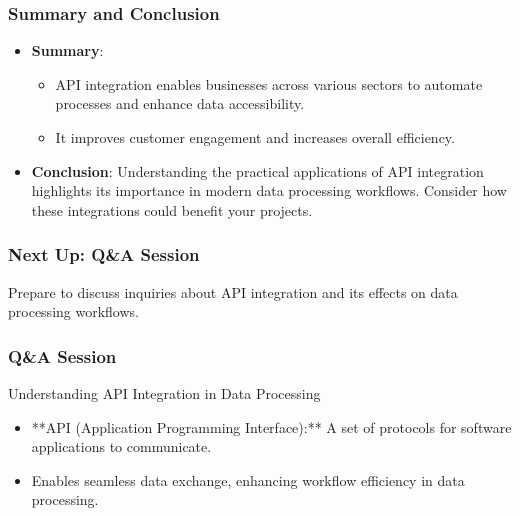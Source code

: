 \documentclass[aspectratio=169]{beamer}
\begin{document}
\begin{frame}[fragile]
    \frametitle{Summary and Conclusion}
    \begin{itemize}
        \item \textbf{Summary}:
        \begin{itemize}
            \item API integration enables businesses across various sectors to automate processes and enhance data accessibility.
            \item It improves customer engagement and increases overall efficiency.
        \end{itemize}
        \item \textbf{Conclusion}:
        Understanding the practical applications of API integration highlights its importance in modern data processing workflows. Consider how these integrations could benefit your projects.
    \end{itemize}
\end{frame}

\begin{frame}[fragile]
    \frametitle{Next Up: Q\&A Session}
    Prepare to discuss inquiries about API integration and its effects on data processing workflows.
\end{frame}

\begin{frame}[fragile]
    \frametitle{Q\&A Session}
    \begin{block}{Understanding API Integration in Data Processing}
        \begin{itemize}
            \item **API (Application Programming Interface):** A set of protocols for software applications to communicate.
            \item Enables seamless data exchange, enhancing workflow efficiency in data processing.
        \end{itemize}
    \end{block}
\end{frame}
\end{document}
